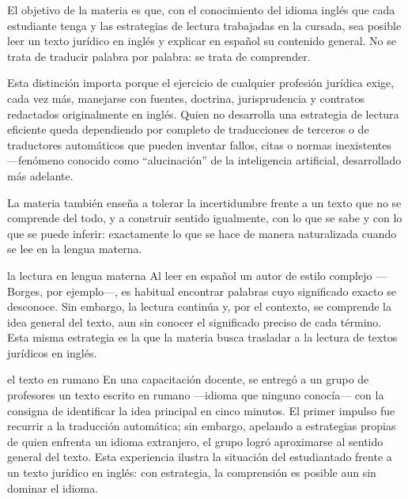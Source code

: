 \documentclass[12pt,oneside]{book}
\begin{document}
\begin{important}
El objetivo de la materia es que, con el conocimiento del idioma inglés que cada estudiante tenga y las estrategias de lectura trabajadas en la cursada, sea posible leer un texto jurídico en inglés y explicar en español su contenido general. No se trata de traducir palabra por palabra: se trata de comprender.
\end{important}

Esta distinción importa porque el ejercicio de cualquier profesión jurídica exige, cada vez más, manejarse con fuentes, doctrina, jurisprudencia y contratos redactados originalmente en inglés. Quien no desarrolla una estrategia de lectura eficiente queda dependiendo por completo de traducciones de terceros o de traductores automáticos que pueden inventar fallos, citas o normas inexistentes ---fenómeno conocido como ``alucinación'' de la inteligencia artificial, desarrollado más adelante.

La materia también enseña a tolerar la incertidumbre frente a un texto que no se comprende del todo, y a construir sentido igualmente, con lo que se sabe y con lo que se puede inferir: exactamente lo que se hace de manera naturalizada cuando se lee en la lengua materna.

\begin{example}{la lectura en lengua materna}
Al leer en español un autor de estilo complejo ---Borges, por ejemplo---, es habitual encontrar palabras cuyo significado exacto se desconoce. Sin embargo, la lectura continúa y, por el contexto, se comprende la idea general del texto, aun sin conocer el significado preciso de cada término. Esta misma estrategia es la que la materia busca trasladar a la lectura de textos jurídicos en inglés.
\end{example}

\begin{example}{el texto en rumano}
En una capacitación docente, se entregó a un grupo de profesores un texto escrito en rumano ---idioma que ninguno conocía--- con la consigna de identificar la idea principal en cinco minutos. El primer impulso fue recurrir a la traducción automática; sin embargo, apelando a estrategias propias de quien enfrenta un idioma extranjero, el grupo logró aproximarse al sentido general del texto. Esta experiencia ilustra la situación del estudiantado frente a un texto jurídico en inglés: con estrategia, la comprensión es posible aun sin dominar el idioma.
\end{example}
\end{document}
